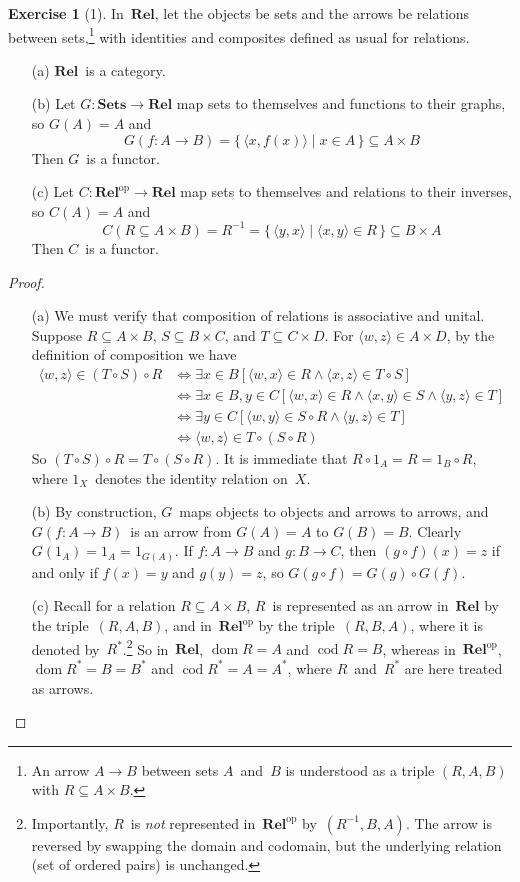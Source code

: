 \documentclass[letterpaper,12pt]{article}
\newcommand{\after}{\circ}
\DeclareMathOperator{\dom}{dom}
\DeclareMathOperator{\cod}{cod}
\newcommand{\pair}[2]{\langle{#1},{#2}\rangle}
\newcommand{\inv}[1]{#1^{-1}}
\renewcommand{\star}[1]{#1^{*}}
\newcommand{\cat}[1]{\mathbf{#1}}
\newcommand{\dual}[1]{#1^{\mathrm{op}}}
\newcommand{\2}{\cat{2}}
\newcommand{\Rel}{\cat{Rel}}
\newcommand{\Relop}{\dual{\Rel}}
\newcommand{\Sets}{\cat{Sets}}
\theoremstyle{definition}
\newtheorem*{exer}{Exercise}
\theoremstyle{remark}
\theoremstyle{direction}
\begin{document}
\begin{exer}[1]
In~\(\Rel\), let the objects be sets and the arrows be relations between sets,\footnote{An arrow \(A\to B\) between sets \(A\)~and~\(B\) is understood as a triple \((R,A,B)\) with \(R\subseteq A\times B\).} with identities and composites defined as usual for relations.
\begin{enumerate}[itemsep=0pt]
\item[(a)] \(\Rel\)~is a category.
\item[(b)] Let \(G:\Sets\to\Rel\) map sets to themselves and functions to their graphs, so \(G(A)=A\) and
\[G(f:A\to B)=\{\,\pair{x}{f(x)}\mid x\in A\,\}\subseteq A\times B\]
Then \(G\)~is a functor.
\item[(c)] Let \(C:\Relop\to\Rel\) map sets to themselves and relations to their inverses, so \(C(A)=A\) and
\[C(R\subseteq A\times B)=\inv{R}=\{\,\pair{y}{x}\mid\pair{x}{y}\in R\,\}\subseteq B\times A\]
Then \(C\)~is a functor.
\end{enumerate}
\begin{proof}\
\begin{enumerate}[itemsep=0pt]
\item[(a)] We must verify that composition of relations is associative and unital. Suppose \(R\subseteq A\times B\), \(S\subseteq B\times C\), and \(T\subseteq C\times D\). For \(\pair{w}{z}\in A\times D\), by the definition of composition we have
\begin{align*}
\pair{w}{z}\in(T\after S)\after R&\iff\exists x\in B[\pair{w}{x}\in R\land\pair{x}{z}\in T\after S]\\
								&\iff\exists x\in B,y\in C[\pair{w}{x}\in R\land\pair{x}{y}\in S\land\pair{y}{z}\in T]\\
								&\iff\exists y\in C[\pair{w}{y}\in S\after R\land\pair{y}{z}\in T]\\
								&\iff\pair{w}{z}\in T\after(S\after R)
\end{align*}
So \((T\after S)\after R=T\after(S\after R)\). It is immediate that \(R\after 1_A=R=1_B\after R\), where \(1_X\)~denotes the identity relation on~\(X\).
\item[(b)] By construction, \(G\)~maps objects to objects and arrows to arrows, and \(G(f:A\to B)\)~is an arrow from \(G(A)=A\) to \(G(B)=B\). Clearly \(G(1_A)=1_A=1_{G(A)}\). If \(f:A\to B\) and \(g:B\to C\), then \((g\after f)(x)=z\) if and only if \(f(x)=y\) and \(g(y)=z\), so \(G(g\after f)=G(g)\after G(f)\).
\item[(c)] Recall for a relation \(R\subseteq A\times B\), \(R\)~is represented as an arrow in~\(\Rel\) by the triple~\((R,A,B)\), and in~\(\Relop\) by the triple~\((R,B,A)\), where it is denoted by~\(\star{R}\).\footnote{Importantly, \(R\)~is \emph{not} represented in~\(\Relop\) by~\((\inv{R},B,A)\). The arrow is reversed by swapping the domain and codomain, but the underlying relation (set of ordered pairs) is unchanged.} So in~\(\Rel\), \(\dom R=A\) and \(\cod R=B\), whereas in~\(\Relop\), \(\dom\star{R}=B=\star{B}\) and \(\cod\star{R}=A=\star{A}\), where \(R\)~and~\(\star{R}\) are here treated as arrows.


\end{enumerate}
\end{proof}
\end{exer}
\end{document}
